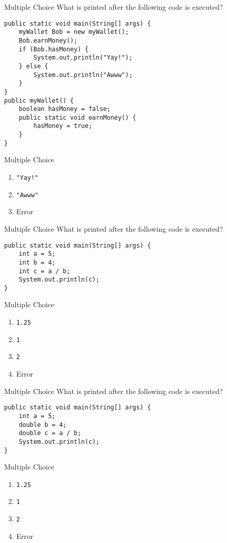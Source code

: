 \documentclass[9pt]{beamer}
\begin{document}
\begin{frame}[fragile]{Multiple Choice}
  What is printed after the following code is executed?

  \begin{lstlisting}
public static void main(String[] args) {
    myWallet Bob = new myWallet();
    Bob.earnMoney();
    if (Bob.hasMoney) {
        System.out.println("Yay!");
    } else {
        System.out.println("Awww");
    }
}
public myWallet() {
    boolean hasMoney = false;
    public static void earnMoney() {
        hasMoney = true;
    }
}
  \end{lstlisting}
\end{frame}
\begin{frame}[fragile]{Multiple Choice}
  \begin{enumerate}
    \item
      {\tt "Yay!"}
    \item
      {\tt "Awww"}
    \item
      \alert<2>{Error}
  \end{enumerate}
\end{frame}

\begin{frame}[fragile]{Multiple Choice}
  What is printed after the following code is executed?

  \begin{lstlisting}
public static void main(String[] args) {
    int a = 5;
    int b = 4;
    int c = a / b;
    System.out.println(c);
}
  \end{lstlisting}
\end{frame}
\begin{frame}[fragile]{Multiple Choice}
  \begin{enumerate}
    \item
      {\tt 1.25}
    \item
      \alert<2>{{\tt 1}}
    \item
      {\tt 2}
    \item
      Error
  \end{enumerate}
\end{frame}

\begin{frame}[fragile]{Multiple Choice}
  What is printed after the following code is executed?

  \begin{lstlisting}
public static void main(String[] args) {
    int a = 5;
    double b = 4;
    double c = a / b;
    System.out.println(c);
}
  \end{lstlisting}
\end{frame}
\begin{frame}[fragile]{Multiple Choice}
  \begin{enumerate}
    \item
      \alert<2>{\tt 1.25}
    \item
      {\tt 1}
    \item
      {\tt 2}
    \item
      Error
  \end{enumerate}
\end{frame}
\end{document}
